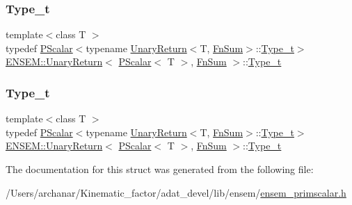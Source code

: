 \subsubsection{\texorpdfstring{Type\_t}{Type\_t}\hspace{0.1cm}{\footnotesize\ttfamily [1/2]}}
{\footnotesize\ttfamily template$<$class T $>$ \\
typedef \mbox{\hyperlink{classENSEM_1_1PScalar}{P\+Scalar}}$<$typename \mbox{\hyperlink{structENSEM_1_1UnaryReturn}{Unary\+Return}}$<$T, \mbox{\hyperlink{structENSEM_1_1FnSum}{Fn\+Sum}}$>$\+::\mbox{\hyperlink{structENSEM_1_1UnaryReturn_3_01PScalar_3_01T_01_4_00_01FnSum_01_4_abc54c8d313930663db099556679c774a}{Type\+\_\+t}}$>$ \mbox{\hyperlink{structENSEM_1_1UnaryReturn}{E\+N\+S\+E\+M\+::\+Unary\+Return}}$<$ \mbox{\hyperlink{classENSEM_1_1PScalar}{P\+Scalar}}$<$ T $>$, \mbox{\hyperlink{structENSEM_1_1FnSum}{Fn\+Sum}} $>$\+::\mbox{\hyperlink{structENSEM_1_1UnaryReturn_3_01PScalar_3_01T_01_4_00_01FnSum_01_4_abc54c8d313930663db099556679c774a}{Type\+\_\+t}}}

\mbox{\label{structENSEM_1_1UnaryReturn_3_01PScalar_3_01T_01_4_00_01FnSum_01_4_abc54c8d313930663db099556679c774a}} 
\subsubsection{\texorpdfstring{Type\_t}{Type\_t}\hspace{0.1cm}{\footnotesize\ttfamily [2/2]}}
{\footnotesize\ttfamily template$<$class T $>$ \\
typedef \mbox{\hyperlink{classENSEM_1_1PScalar}{P\+Scalar}}$<$typename \mbox{\hyperlink{structENSEM_1_1UnaryReturn}{Unary\+Return}}$<$T, \mbox{\hyperlink{structENSEM_1_1FnSum}{Fn\+Sum}}$>$\+::\mbox{\hyperlink{structENSEM_1_1UnaryReturn_3_01PScalar_3_01T_01_4_00_01FnSum_01_4_abc54c8d313930663db099556679c774a}{Type\+\_\+t}}$>$ \mbox{\hyperlink{structENSEM_1_1UnaryReturn}{E\+N\+S\+E\+M\+::\+Unary\+Return}}$<$ \mbox{\hyperlink{classENSEM_1_1PScalar}{P\+Scalar}}$<$ T $>$, \mbox{\hyperlink{structENSEM_1_1FnSum}{Fn\+Sum}} $>$\+::\mbox{\hyperlink{structENSEM_1_1UnaryReturn_3_01PScalar_3_01T_01_4_00_01FnSum_01_4_abc54c8d313930663db099556679c774a}{Type\+\_\+t}}}



The documentation for this struct was generated from the following file\+:\begin{DoxyCompactItemize}
\item 
/\+Users/archanar/\+Kinematic\+\_\+factor/adat\+\_\+devel/lib/ensem/\mbox{\hyperlink{lib_2ensem_2ensem__primscalar_8h}{ensem\+\_\+primscalar.\+h}}\end{DoxyCompactItemize}
